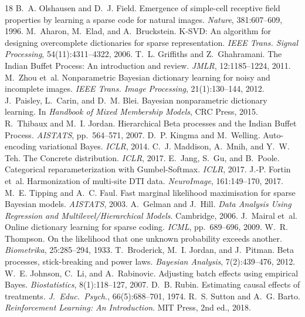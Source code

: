 \documentclass[11pt,a4paper]{article}
\theoremstyle{definition}
\begin{document}

\begin{thebibliography}{18}
 B.~A. Olshausen and D.~J. Field. Emergence of simple-cell receptive field properties by learning a sparse code for natural images. \textit{Nature}, 381:607--609, 1996.
 M.~Aharon, M.~Elad, and A.~Bruckstein. K-SVD: An algorithm for designing overcomplete dictionaries for sparse representation. \textit{IEEE Trans. Signal Processing}, 54(11):4311--4322, 2006.
 T.~L. Griffiths and Z.~Ghahramani. The Indian Buffet Process: An introduction and review. \textit{JMLR}, 12:1185--1224, 2011.
 M.~Zhou et~al. Nonparametric Bayesian dictionary learning for noisy and incomplete images. \textit{IEEE Trans. Image Processing}, 21(1):130--144, 2012.
 J.~Paisley, L.~Carin, and D.~M. Blei. Bayesian nonparametric dictionary learning. In \textit{Handbook of Mixed Membership Models}, CRC Press, 2015.
 R.~Thibaux and M.~I. Jordan. Hierarchical Beta processes and the Indian Buffet Process. \textit{AISTATS}, pp.~564--571, 2007.
 D.~P. Kingma and M.~Welling. Auto-encoding variational Bayes. \textit{ICLR}, 2014.
 C.~J. Maddison, A.~Mnih, and Y.~W. Teh. The Concrete distribution. \textit{ICLR}, 2017.
 E.~Jang, S.~Gu, and B.~Poole. Categorical reparameterization with Gumbel-Softmax. \textit{ICLR}, 2017.
 J.-P. Fortin et~al. Harmonization of multi-site DTI data. \textit{NeuroImage}, 161:149--170, 2017.
 M.~E. Tipping and A.~C. Faul. Fast marginal likelihood maximisation for sparse Bayesian models. \textit{AISTATS}, 2003.
 A.~Gelman and J.~Hill. \textit{Data Analysis Using Regression and Multilevel/Hierarchical Models}. Cambridge, 2006.
 J.~Mairal et~al. Online dictionary learning for sparse coding. \textit{ICML}, pp.~689--696, 2009.
 W.~R. Thompson. On the likelihood that one unknown probability exceeds another. \textit{Biometrika}, 25:285--294, 1933.
 T.~Broderick, M.~I. Jordan, and J.~Pitman. Beta processes, stick-breaking and power laws. \textit{Bayesian Analysis}, 7(2):439--476, 2012.
 W.~E. Johnson, C.~Li, and A.~Rabinovic. Adjusting batch effects using empirical Bayes. \textit{Biostatistics}, 8(1):118--127, 2007.
 D.~B. Rubin. Estimating causal effects of treatments. \textit{J.~Educ.~Psych.}, 66(5):688--701, 1974.
 R.~S. Sutton and A.~G. Barto. \textit{Reinforcement Learning: An Introduction}. MIT Press, 2nd ed., 2018.
\end{thebibliography}
\end{document}
